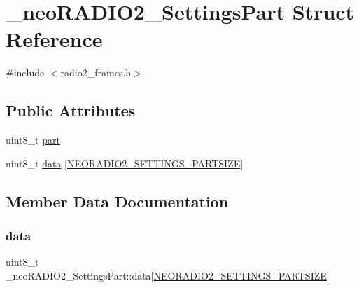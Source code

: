 \hypertarget{struct__neo_r_a_d_i_o2___settings_part}{}\section{\+\_\+neo\+R\+A\+D\+I\+O2\+\_\+\+Settings\+Part Struct Reference}
\label{struct__neo_r_a_d_i_o2___settings_part}


{\ttfamily \#include $<$radio2\+\_\+frames.\+h$>$}

\subsection*{Public Attributes}
\begin{DoxyCompactItemize}
\item 
uint8\+\_\+t \mbox{\hyperlink{struct__neo_r_a_d_i_o2___settings_part_a8402555188a9b2d5f8c1ba9a09e0998a}{part}}
\item 
uint8\+\_\+t \mbox{\hyperlink{struct__neo_r_a_d_i_o2___settings_part_acc43a15380b9e5c269d84c0255fe8777}{data}} \mbox{[}\mbox{\hyperlink{radio2__frames_8h_acc3c55ac88257a6d4febb9501a925a58}{N\+E\+O\+R\+A\+D\+I\+O2\+\_\+\+S\+E\+T\+T\+I\+N\+G\+S\+\_\+\+P\+A\+R\+T\+S\+I\+ZE}}\mbox{]}
\end{DoxyCompactItemize}


\subsection{Member Data Documentation}
\mbox{\label{struct__neo_r_a_d_i_o2___settings_part_acc43a15380b9e5c269d84c0255fe8777}} 
\subsubsection{\texorpdfstring{data}{data}}
{\footnotesize\ttfamily uint8\+\_\+t \+\_\+neo\+R\+A\+D\+I\+O2\+\_\+\+Settings\+Part\+::data\mbox{[}\mbox{\hyperlink{radio2__frames_8h_acc3c55ac88257a6d4febb9501a925a58}{N\+E\+O\+R\+A\+D\+I\+O2\+\_\+\+S\+E\+T\+T\+I\+N\+G\+S\+\_\+\+P\+A\+R\+T\+S\+I\+ZE}}\mbox{]}}

\mbox{\label{struct__neo_r_a_d_i_o2___settings_part_a8402555188a9b2d5f8c1ba9a09e0998a}} 
